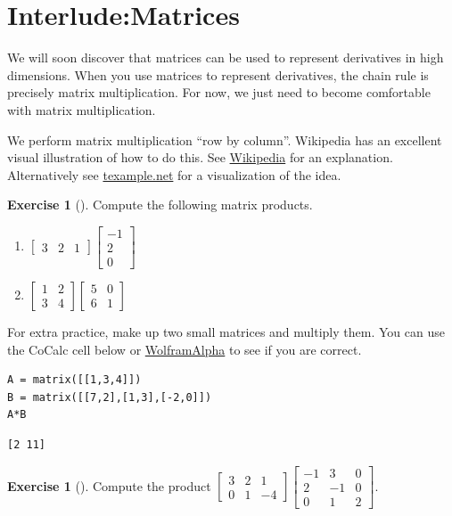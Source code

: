 \documentclass[10pt,]{book}
\theoremstyle{plain}
\theoremstyle{definition}
\theoremstyle{definition}
\theoremstyle{definition}
\theoremstyle{definition}
\newtheorem{exploration}[project]{Exercise}
\theoremstyle{definition}
\numberwithin{equation}{section}
\newcommand{\amp}{&}
\begin{document}
\section[{Interlude:Matrices}]{Interlude:Matrices}\label{review_matrices}
We will soon discover that matrices can be used to represent derivatives in high dimensions. When you use matrices to represent derivatives, the chain rule is precisely matrix multiplication. For now, we just need to become comfortable with matrix multiplication.%
\par
We perform matrix multiplication ``row by column''. Wikipedia has an excellent visual illustration of how to do this. See \href{http://en.wikipedia.org/wiki/Matrix_multiplication}{Wikipedia} for an explanation. Alternatively see \href{http://www.texample.net/tikz/examples/matrix-multiplication/}{texample.net} for a visualization of the idea.%
\begin{exploration}[]\label{exploration-37}
Compute the following matrix products.%
\begin{enumerate}[font=\bfseries,label=(\alph*),ref=\alph*]
\item\label{task-70} \(\begin{bmatrix}3 \amp  2\amp  1
\end{bmatrix} 
\begin{bmatrix}-1 \\
2\\
0
\end{bmatrix}\)%
\item\label{task-71} \(\begin{bmatrix}1 \amp 2\\3\amp 4
\end{bmatrix} \begin{bmatrix}5\amp 0\\6\amp 1
\end{bmatrix}\)%
\end{enumerate}
\bigbreak
For extra practice, make up two small matrices and multiply them. You can use the CoCalc cell below or \href{http://www.wolframalpha.com/input/?i=\%281\%2C3\%2C4\%29+*\%28\%287\%2C2\%29\%2C\%281\%2C3\%29\%2C\%28-2\%2C0\%29\%29}{WolframAlpha} to see if you are correct.%
\begin{lstlisting}[style=sageinput]
A = matrix([[1,3,4]])
B = matrix([[7,2],[1,3],[-2,0]])
A*B
\end{lstlisting}
\begin{lstlisting}[style=sageoutput]
[2 11]
\end{lstlisting}
\end{exploration}
\begin{exploration}[]\label{exploration-38}
Compute the product \(\begin{bmatrix}3 \amp  2\amp  1\\
0 \amp  1\amp  -4
\end{bmatrix} 
\begin{bmatrix}-1\amp 3 \amp 0 \\
2\amp -1 \amp 0\\
0\amp 1 \amp 2
\end{bmatrix}\).%
\end{exploration}
\typeout{************************************************}
\typeout{************************************************}
\end{document}
